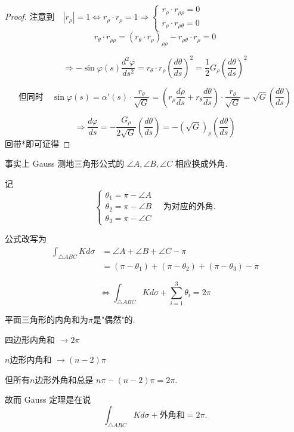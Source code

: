 \documentclass[lang=cn,10pt,thmcnt=section]{elegantbook}
\begin{document}
\begin{proof}
注意到$\quad |r_\rho| = 1 \iff r_\rho \cdot r_\rho = 1 \Rightarrow 
\begin{cases}
r_\rho \cdot r_{\rho\rho} = 0 \\
r_\rho \cdot r_{\rho\theta} = 0
\end{cases}$
\[
r_\theta \cdot r_{\rho\rho} = (r_\theta \cdot r_\rho)_{\rho\rho} - r_{\rho\theta} \cdot r_\rho = 0
\]

\[
\Rightarrow -\sin\varphi(s) \frac{d^2 \varphi}{ds^2} = r_\theta \cdot r_\rho \left( \frac{d\theta}{ds} \right)^2 = \frac{1}{2} G_\rho \left( \frac{d\theta}{ds} \right)^2
\]

\[
\text{但同时} \quad \sin\varphi(s) = \alpha'(s) \cdot \frac{r_\theta}{\sqrt{G}} = \left( r_\rho \frac{d\rho}{ds} + r_\theta \frac{d\theta}{ds} \right) \cdot \frac{r_\theta}{\sqrt{G}} = \sqrt{G} \left( \frac{d\theta}{ds} \right)
\]

\[
\Rightarrow \frac{d\varphi}{ds} = -\frac{G_\rho}{2\sqrt{G}} \left( \frac{d\theta}{ds} \right) = -\left( \sqrt{G} \right)_\rho \left( \frac{d\theta}{ds} \right)
\]
回带*即可证得


\end{proof}
\begin{remark}
    事实上 Gauss 测地三角形公式的 $\angle A, \angle B, \angle C$ 相应换成外角.
\end{remark}
\begin{definition}[外角]
    记
$$
\begin{cases}
\theta_1 = \pi - \angle A \\
\theta_2 = \pi - \angle B \\
\theta_3 = \pi - \angle C
\end{cases}
\quad \text{为对应的外角.}
$$
\end{definition}
公式改写为
\begin{align*}
\int_{\triangle ABC} K d\sigma &= \angle A + \angle B + \angle C - \pi \\
&= (\pi - \theta_1) + (\pi - \theta_2) + (\pi - \theta_3) - \pi
\end{align*}

$$
\iff \boxed{\int_{\triangle ABC} K d\sigma + \sum_{i=1}^{3} \theta_i = 2\pi}
$$

\begin{remark}
    平面三角形的内角和为$\pi$是"偶然"的.

四边形内角和 $\to 2\pi$

$n$边形内角和 $\to (n-2)\pi$

但所有$n$边形外角和总是 $n\pi - (n-2)\pi = 2\pi$.

故而 Gauss 定理是在说
$$ \int_{\triangle ABC} K d\sigma + \text{外角和} = 2\pi. $$
\end{remark}
\end{document}
